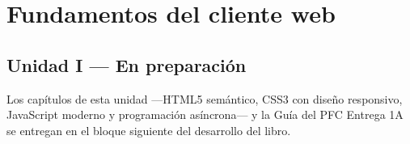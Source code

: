 %
\part{Fundamentos del cliente web}
\label{part:unidad1}

\chapter*{Unidad I --- En preparaci\'on}

Los cap\'itulos de esta unidad ---HTML5 sem\'antico, CSS3 con dise\~no responsivo, JavaScript moderno y programaci\'on as\'incrona--- y la Gu\'ia del PFC Entrega 1A se entregan en el bloque siguiente del desarrollo del libro.

\cleardoublepage
